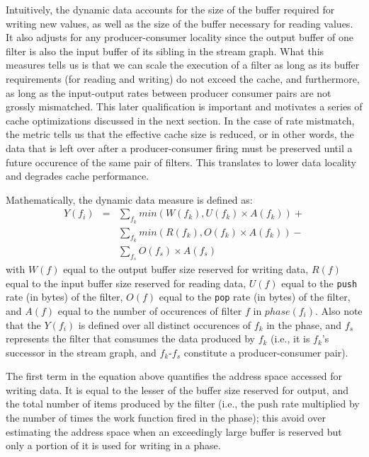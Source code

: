 Intuitively, the dynamic data accounts for the size of the buffer
required for writing new values, as well as the size of the buffer
necessary for reading values. It also adjusts for any
producer-consumer locality since the output buffer of one filter is
also the input buffer of its sibling in the stream graph. What this
measures tells us is that we can scale the execution of a filter as
long as its buffer requirements (for reading and writing) do not
exceed the cache, and furthermore, as long as the input-output rates
between producer consumer pairs are not grossly mismatched. This later
qualification is important and motivates a series of cache
optimizations discussed in the next section. In the case of rate
mistmatch, the metric tells us that the effective cache size is
reduced, or in other words, the data that is left over after a
producer-consumer firing must be preserved until a future occurence of
the same pair of filters. This translates to lower data locality and
degrades cache performance.

Mathematically, the dynamic data measure is defined as:
\begin{eqnarray}
  \nonumber
  Y(f_i) &=&\sum_{f_k} min(W(f_k), U(f_k) \times A(f_k)) + \\
  \nonumber
	   &&\sum_{f_k} min(R(f_k), O(f_k) \times A(f_k)) - \\
  \nonumber
         &&\sum_{f_s} O(f_s) \times A(f_s)
\end{eqnarray}
with $W(f)$ equal to the output buffer size reserved for writing data, $R(f)$
equal to the input buffer size reserved for reading data, $U(f)$ equal to the
{\tt push} rate (in bytes) of the filter, $O(f)$ equal to the {\tt pop} rate (in
bytes) of the filter, and $A(f)$ equal to the number of occurences of
filter $f$ in $phase(f_i)$. Also note that the $Y(f_i)$ is defined
over all distinct occurences of $f_k$ in the phase, and $f_s$
represents the filter that comsumes the data produced by $f_k$ (i.e.,
it is $f_k$'s successor in the stream graph, and $f_k$-$f_s$
constitute a producer-consumer pair).

The first term in the equation above quantifies the address space
accessed for writing data. It is  equal to the lesser of the buffer size
reserved for output, and the total number of items produced by
the filter (i.e., the push rate multiplied by the number of times the
work function fired in the phase); this avoid over estimating the
address space when an exceedingly large buffer is reserved but only a
portion of it is used for writing in a phase.

